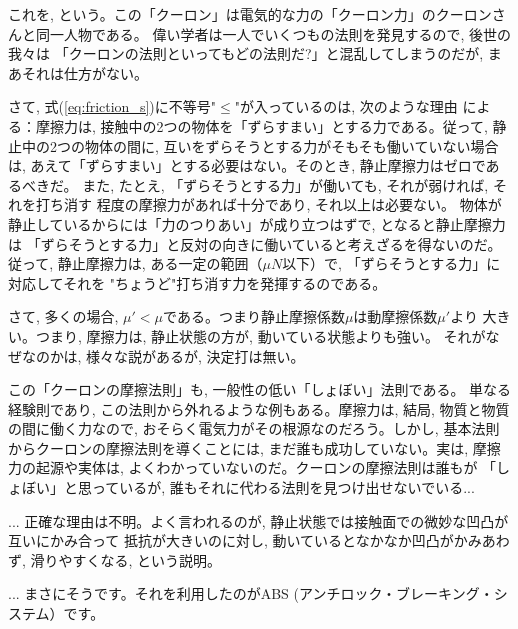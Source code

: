 これを, 
という。この「クーロン」は電気的な力の「クーロン力」のクーロンさんと同一人物である。
偉い学者は一人でいくつもの法則を発見するので, 後世の我々は
「クーロンの法則といってもどの法則だ?」と混乱してしまうのだが, まあそれは仕方がない。

さて, 式(\ref{eq:friction_s})に不等号"$\leq$"が入っているのは, 次のような理由
による：摩擦力は, 接触中の2つの物体を「ずらすまい」とする力である。従って, 
静止中の2つの物体の間に, 互いをずらそうとする力がそもそも働いていない場合は, 
あえて「ずらすまい」とする必要はない。そのとき, 静止摩擦力はゼロであるべきだ。
また, たとえ, 「ずらそうとする力」が働いても, それが弱ければ, それを打ち消す
程度の摩擦力があれば十分であり, それ以上は必要ない。
物体が静止しているからには「力のつりあい」が成り立つはずで, となると静止摩擦力は
「ずらそうとする力」と反対の向きに働いていると考えざるを得ないのだ。
従って, 静止摩擦力は, 
ある一定の範囲（$\mu N$以下）で, 「ずらそうとする力」に対応してそれを
"ちょうど"打ち消す力を発揮するのである。

さて, 多くの場合, $\mu'<\mu$である。つまり静止摩擦係数$\mu$は動摩擦係数$\mu'$より
大きい。つまり, 摩擦力は, 静止状態の方が, 動いている状態よりも強い。
それがなぜなのかは, 様々な説があるが, 決定打は無い。

この「クーロンの摩擦法則」も, 一般性の低い「しょぼい」法則である。
単なる経験則であり, この法則から外れるような例もある。摩擦力は, 結局, 
物質と物質の間に働く力なので, おそらく電気力がその根源なのだろう。しかし, 
基本法則からクーロンの摩擦法則を導くことには, まだ誰も成功していない。実は, 
摩擦力の起源や実体は, よくわかっていないのだ。クーロンの摩擦法則は誰もが
「しょぼい」と思っているが, 誰もそれに代わる法則を見つけ出せないでいる...\mv

\begin{faq}{\small{}
... 正確な理由は不明。よく言われるのが, 静止状態では接触面での微妙な凹凸が互いにかみ合って
抵抗が大きいのに対し, 動いているとなかなか凹凸がかみあわず, 滑りやすくなる, という説明。}\end{faq}

\begin{faq}{\small{}
... まさにそうです。それを利用したのがABS (アンチロック・ブレーキング・システム）です。}\end{faq}


